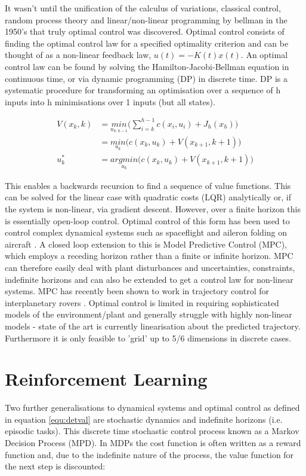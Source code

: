\documentclass[12pt]{report}
\begin{document}
It wasn't until the unification of the calculus of variations, classical control, random process theory and linear/non-linear programming by bellman in the 1950's \cite{History} that truly optimal control was discovered. Optimal control consists of finding the optimal control law for a specified optimality criterion and can be thought of as a non-linear feedback law, $u(t) = -K(t)x(t)$. An optimal control law can be found by solving the Hamilton-Jacobi-Bellman equation in continuous time, or via dynamic programming (DP) in discrete time. DP is a systematic procedure for transforming an optimisation over a sequence of h inputs into h minimisations over 1 inputs (but all states).

\begin{align}
    \label{equ:detval} 
    V(x_k, k) & = \underset{u_{k:h-1}}{min} \bigg( \sum_{i=k}^{h-1} c(x_i, u_i) + J_h(x_h) \bigg) \\ 
    & = \underset{u_k}{min} \Big( c(x_k, u_k) + V(x_{k+1}, k+1) \Big) \\
    u^{*}_k & = \underset{u_k}{argmin} \Big( c(x_k, u_k) + V(x_{k+1}, k+1) \Big)
\end{align}

This enables a backwards recursion to find a sequence of value functions. This can be solved for the linear case with quadratic costs (LQR) analytically or, if the system is non-linear, via gradient descent. However, over a finite horizon this is essentially open-loop control. Optimal control of this form has been used to control complex dynamical systems such as spaceflight and aileron folding on aircraft \cite{aircraftoptcont, aileronoptcont}. A closed loop extension to this is Model Predictive Control (MPC), which employs a receding horizon rather than a finite or infinite horizon. MPC can therefore easily deal with plant disturbances and uncertainties, constraints, indefinite horizons and can also be extended to get a control law for non-linear systems. MPC has recently been shown to work in trajectory control for interplanetary rovers \cite{rovermpc}. Optimal control is limited in requiring sophisticated models of the environment/plant and generally struggle with highly non-linear models - state of the art is currently linearisation about the predicted trajectory. Furthermore it is only feasible to 'grid' up to 5/6 dimensions in discrete cases.

\section{Reinforcement Learning}
Two further generalisations to dynamical systems and optimal control as defined in equation \ref{equ:detval} are stochastic dynamics and indefinite horizons (i.e. episodic tasks). This discrete time stochastic control process known as a Markov Decision Process (MPD). In MDPs the cost function is often written as a reward function and, due to the indefinite nature of the process, the value function for the next step is discounted:
\end{document}
